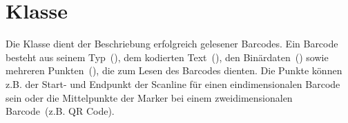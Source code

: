 \section{Klasse }
Die Klasse  dient der Beschriebung erfolgreich gelesener Barcodes.
Ein Barcode besteht aus seinem Typ~(), dem kodierten Text~(), den Binärdaten~() sowie mehreren Punkten~(), die zum Lesen des Barcodes dienten.
Die Punkte können z.B. der Start- und Endpunkt der Scanline für einen eindimensionalen Barcode sein oder die Mittelpunkte der Marker bei einem zweidimensionalen Barcode~(z.B. QR Code).


